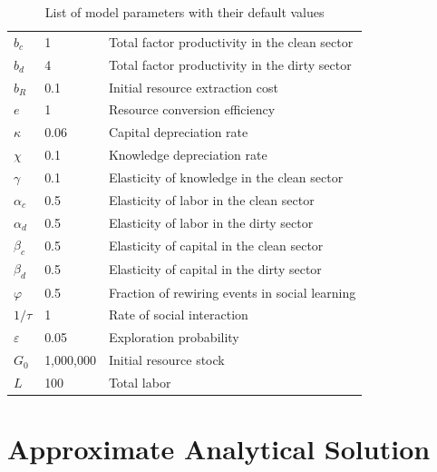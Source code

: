 \begin{table}
	\centering
	\begin{tabular}{l|l|l}
		\hline
		$b_c$ & 1 & Total factor productivity in the clean sector \\
		$b_d$ & 4 & Total factor productivity in the dirty sector \\
		$b_R$ & 0.1 & Initial resource extraction cost \\
		$e$   & 1 & Resource conversion efficiency \\
		$\kappa$   & 0.06 & Capital depreciation rate \\
		$\chi$      & 0.1 & Knowledge depreciation rate \\
		$\gamma$	   & 0.1 & Elasticity of knowledge in the clean sector \\
		$\alpha_c$ & 0.5 & Elasticity of labor in the clean sector \\
		$\alpha_d$ & 0.5 & Elasticity of labor in the dirty sector \\
		$\beta_c$ & 0.5 & Elasticity of capital in the clean sector \\
		$\beta_d$ & 0.5 & Elasticity of capital in the dirty sector \\
		$\varphi$ & 0.5 & Fraction of rewiring events in social learning \\
		$1/\tau$ & 1 & Rate of social interaction \\ 
		$\varepsilon$ & 0.05 & Exploration probability \\ 
                $G_0$ & 1,000,000 & Initial resource stock \\
        $L$ & 100 & Total labor \\ 
        \hline
	\end{tabular}
	\caption{List of model parameters with their default values}
	\label{tab:Parameter_list}
\end{table}

\section{Approximate Analytical Solution}
\label{sec:Approximation}

